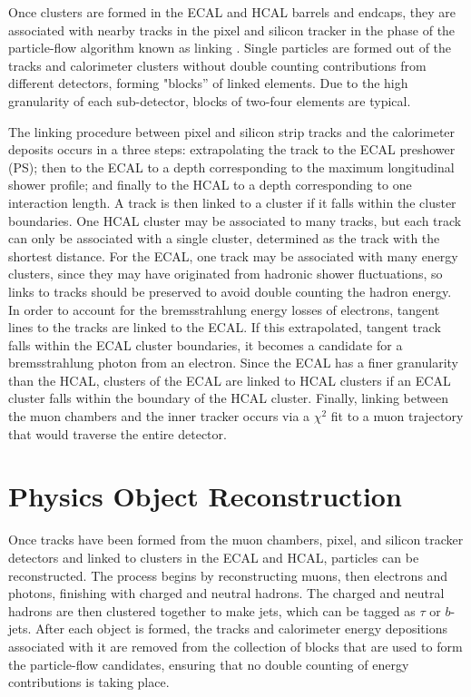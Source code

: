 \par Once clusters are formed in the ECAL and HCAL barrels and
endcaps, they are associated with nearby tracks in the pixel and
silicon tracker in the phase of the particle-flow algorithm known as
linking \cite{CMS-PAS-PFT-09-001}.  Single particles are formed out of
the tracks and calorimeter clusters without double counting
contributions from different detectors, forming "blocks'' of linked
elements.  Due to the high granularity of each sub-detector, blocks of
two-four elements are typical.  

\par The linking procedure between pixel and silicon strip tracks and
the calorimeter deposits occurs in a three steps: extrapolating the
track to the ECAL preshower (PS); then to the ECAL to a depth
corresponding to the maximum longitudinal shower profile; and finally
to the HCAL to a depth corresponding to one interaction length.  A
track is then linked to a cluster if it falls within the cluster
boundaries.  One HCAL cluster may be associated to many tracks, but
each track can only be associated with a single cluster, determined as
the track with the shortest distance.  For the ECAL, one track may be
associated with many energy clusters, since they may have originated
from hadronic shower fluctuations, so links to tracks should be
preserved to avoid double counting the hadron energy.  In order to
account for the bremsstrahlung energy losses of electrons, tangent
lines to the tracks are linked to the ECAL.  If this extrapolated,
tangent track falls within the ECAL cluster boundaries, it becomes a
candidate for a bremsstrahlung photon from an electron.  Since the
ECAL has a finer granularity than the HCAL, clusters of the ECAL are
linked to HCAL clusters if an ECAL cluster falls within the boundary
of the HCAL cluster.   Finally, linking between the muon chambers and
the inner tracker occurs via a $\chi^{2}$ fit to a muon trajectory
that would traverse the entire detector.    

\section{Physics Object Reconstruction}
\label{physics_object_recostruction}

\par Once tracks have been formed from the muon chambers, pixel, and
silicon tracker detectors and linked to clusters in the ECAL and HCAL,
particles can be reconstructed.  The process begins by reconstructing
muons, then electrons and photons, finishing with charged and neutral
hadrons.  The charged and neutral hadrons are then clustered together to
make jets, which can be tagged as $\tau$ or $b$-jets.  After each
object is formed, the tracks and calorimeter energy depositions
associated with it are removed from the collection of blocks that are
used to form the particle-flow candidates, ensuring that no double
counting of energy contributions is taking place.  

